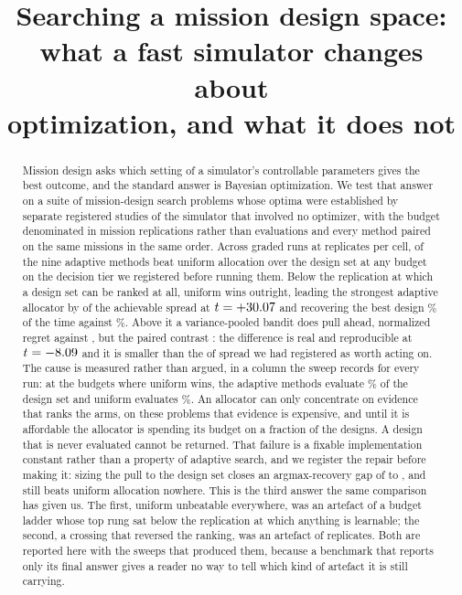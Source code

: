 \documentclass[11pt]{article}
\title{Searching a mission design space: what a fast simulator changes about\\
       optimization, and what it does not}
\author{}
\date{}
\begin{document}
\maketitle

\begin{abstract}
Mission design asks which setting of a simulator's controllable parameters gives the best outcome,
and the standard answer is Bayesian optimization. We test that answer on a suite of
\BnKeyProblems{} mission-design search problems whose optima were established by separate registered
studies of the simulator that involved no optimizer, with the budget denominated in mission
replications rather than evaluations and every method paired on the same missions in the same order.
Across \RsRows{} graded runs at \RsReplicates{} replicates per cell, \RsBeatGrid{} of the nine
adaptive methods beat uniform allocation over the design set at any budget on the decision tier we
registered before running them. Below the replication at which a design set can be ranked at all,
uniform wins outright, leading the strongest adaptive allocator by \RsCrossLowEff{} of the
achievable spread at $t = +30.07{}$ and recovering the best design \RsCrossLowUniFound{}\% of
the time against \RsCrossLowAdaptFound{}\%. Above it a variance-pooled bandit does pull ahead,
\RsCrossTopAdapt{} normalized regret against \RsCrossTopUni{}, but the paired contrast
\RsCrossTopBinds{}: the difference is real and reproducible at $t = -8.09{}$ and it is
smaller than the \RsCrossTopMpe{} of spread we had registered as worth acting on. The cause is measured rather than
argued, in a column the sweep records for every run: at the budgets where uniform wins, the adaptive
methods evaluate \RsLowCoverAdapt{}\% of the design set and uniform evaluates \RsLowCoverUni{}\%. An
allocator can only concentrate on evidence that ranks the arms, on these problems that evidence is
expensive, and until it is affordable the allocator is spending its budget on a fraction of the
designs. A design that is never evaluated cannot be returned. That failure is a fixable
implementation constant rather than a property of adaptive search, and we register the repair before
making it: sizing the pull to the design set closes an argmax-recovery gap of
\WmUcbPooledWarmLowDeficitWas{} to \WmWorstDeficit{}, and still beats uniform allocation nowhere. This is the third answer the
same comparison has given us. The first, uniform unbeatable everywhere, was an artefact of a budget
ladder whose top rung sat below the replication at which anything is learnable; the second, a
crossing that reversed the ranking, was an artefact of \RsPrevReplicates{} replicates. Both are reported here
with the sweeps that produced them, because a benchmark that reports only its final answer gives a
reader no way to tell which kind of artefact it is still carrying.


\end{abstract}
\end{document}
